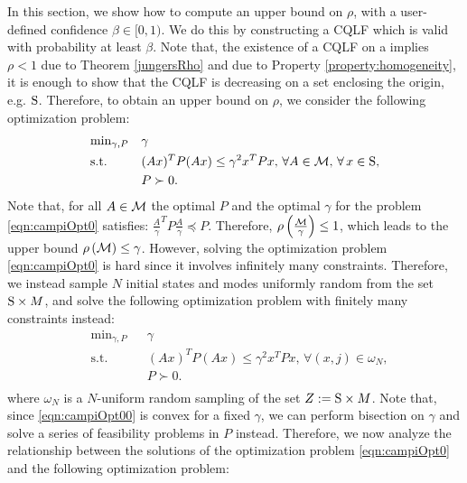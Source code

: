 In this section, we show how to compute an upper bound on $\rho$, with a user-defined confidence $\beta \in [0, 1)$. We do this by constructing a CQLF which is valid with probability at least $\beta$. Note that, the existence of a CQLF on a implies $\rho < 1$ due to Theorem \ref{jungersRho} and due to Property \ref{property:homogeneity}, it is enough to show that the CQLF is decreasing on a set enclosing the origin, e.g. $\text{S}$. Therefore, to obtain an upper bound on $\rho$, we consider the following optimization problem:
\begin{equation}\label{eqn:campiOpt0}
\begin{aligned}
& \text{min}_{\gamma, P} & & \gamma \\
& \text{s.t.} 
&  & (Ax)^TP(Ax) \leq \gamma^2 x^TPx,\,\forall A \in \mathcal{M}, \,\forall\, x \in \text{S},\\
& && P \succ 0. \\
\end{aligned}
\end{equation}
Note that, for all $A \in \mathcal{M}$ the optimal $P$ and the optimal $\gamma$ for the problem \eqref{eqn:campiOpt0} satisfies: $\frac{A}{\gamma}^TP\frac{A}{\gamma} \preceq P$. Therefore, $\rho\left(\frac{\mathcal{M}}{\gamma}\right) \leq 1$, which leads to the upper bound $\rho\left(\mathcal{M} \right) \leq \gamma$. However, solving the optimization problem \eqref{eqn:campiOpt0} is hard since it involves infinitely many constraints. Therefore, we instead sample $N$ initial states and modes uniformly random from the set $\text{S} \times M$, and solve the following optimization problem with finitely many constraints instead:
\begin{equation}\label{eqn:campiOpt00}
\begin{aligned}
& \text{min}_{\gamma, P} & & \gamma \\
& \text{s.t.} 
&  & (Ax)^TP(Ax) \leq \gamma^2 x^TPx,\,\forall (x, j) \in \omega_N,\\
& && P \succ 0. \\
\end{aligned}
\end{equation}
where $\omega_N$ is a $N$-uniform random sampling of the set \mbox{$Z:=\text{S} \times M$}.
Note that, since \eqref{eqn:campiOpt00} is convex for a fixed $\gamma$, we can perform bisection on $\gamma$ and solve a series of feasibility problems in $P$ instead. Therefore, we now analyze the relationship between the solutions of the optimization problem \eqref{eqn:campiOpt0} and the following optimization problem:
